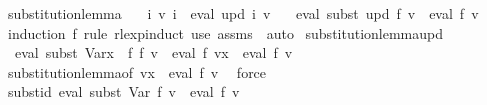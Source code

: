 \begin{isabellebody}
{}
\isamarkuptrue%
%
\endisatagdocument
{\isafolddocument}%
%
\isadelimdocument
%
\endisadelimdocument
{}\isamarkupfalse%
\ substitution{\isacharunderscore}{\kern0pt}lemma{\isacharcolon}{\kern0pt}\isanewline
\ \ \ {\isachardoublequoteopen}{\isasymforall}i{\isachardot}{\kern0pt}\ v{\isacharprime}{\kern0pt}\ i\ {\isacharequal}{\kern0pt}\ eval\ {\isacharparenleft}{\kern0pt}upd\ i{\isacharparenright}{\kern0pt}\ v{\isachardoublequoteclose}\isanewline
\ \ \ {\isachardoublequoteopen}eval\ {\isacharparenleft}{\kern0pt}subst\ upd\ f{\isacharparenright}{\kern0pt}\ v\ {\isacharequal}{\kern0pt}\ eval\ f\ v{\isacharprime}{\kern0pt}{\isachardoublequoteclose}\isanewline
%
\isadelimproof
\ \ %
\endisadelimproof
%
\isatagproof
{}\isamarkupfalse%
\ {\isacharparenleft}{\kern0pt}induction\ f\ rule{\isacharcolon}{\kern0pt}\ rlexp{\isachardot}{\kern0pt}induct{\isacharparenright}{\kern0pt}\ {\isacharparenleft}{\kern0pt}use\ assms\ \ auto{\isacharparenright}{\kern0pt}%
\endisatagproof
{\isafoldproof}%
%
\isadelimproof
\isanewline
%
\endisadelimproof
\isanewline
{}\isamarkupfalse%
\ substitution{\isacharunderscore}{\kern0pt}lemma{\isacharunderscore}{\kern0pt}upd{\isacharcolon}{\kern0pt}\isanewline
\ \ {\isachardoublequoteopen}eval\ {\isacharparenleft}{\kern0pt}subst\ {\isacharparenleft}{\kern0pt}Var{\isacharparenleft}{\kern0pt}x\ {\isacharcolon}{\kern0pt}{\isacharequal}{\kern0pt}\ f{\isacharprime}{\kern0pt}{\isacharparenright}{\kern0pt}{\isacharparenright}{\kern0pt}\ f{\isacharparenright}{\kern0pt}\ v\ {\isacharequal}{\kern0pt}\ eval\ f\ {\isacharparenleft}{\kern0pt}v{\isacharparenleft}{\kern0pt}x\ {\isacharcolon}{\kern0pt}{\isacharequal}{\kern0pt}\ eval\ f{\isacharprime}{\kern0pt}\ v{\isacharparenright}{\kern0pt}{\isacharparenright}{\kern0pt}{\isachardoublequoteclose}\isanewline
%
\isadelimproof
\ \ %
\endisadelimproof
%
\isatagproof
{}\isamarkupfalse%
\ substitution{\isacharunderscore}{\kern0pt}lemma{\isacharbrackleft}{\kern0pt}of\ {\isachardoublequoteopen}v{\isacharparenleft}{\kern0pt}x\ {\isacharcolon}{\kern0pt}{\isacharequal}{\kern0pt}\ eval\ f{\isacharprime}{\kern0pt}\ v{\isacharparenright}{\kern0pt}{\isachardoublequoteclose}{\isacharbrackright}{\kern0pt}\ \isamarkupfalse%
\ force%
\endisatagproof
{\isafoldproof}%
%
\isadelimproof
\isanewline
%
\endisadelimproof
\isanewline
{}\isamarkupfalse%
\ subst{\isacharunderscore}{\kern0pt}id{\isacharcolon}{\kern0pt}\ {\isachardoublequoteopen}eval\ {\isacharparenleft}{\kern0pt}subst\ Var\ f{\isacharparenright}{\kern0pt}\ v\ {\isacharequal}{\kern0pt}\ eval\ f\ v{\isachardoublequoteclose}\isanewline

\end{isabellebody}
